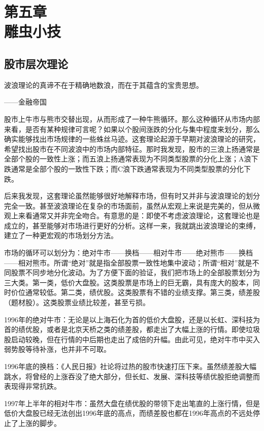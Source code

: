 \setcounter{figure}{0}
\renewcommand{\thefigure}{5-\arabic{figure}}

\section[第五章\q 雕虫小技]{第五章\\ 雕虫小技}

\subsection{股市层次理论}

{\kaishu
波浪理论的真谛不在于精确地数浪，而在于其蕴含的宝贵思想。

\hfill ——金融帝国
}

股市上牛市与熊市交替出现，从而形成了一种牛熊循环。那么这种循环从市场内部来看，是否有某种规律可言呢？如果以个股间涨跌的分化与集中程度来划分，那么确实能够找出市场规律的一些蛛丝马迹。这套理论起源于早期对波浪理论的研究，希望找出股市在不同波浪中的市场内部特征。那时我发现，股市的三浪上扬通常是全部个股的一致性上涨；而五浪上扬通常表现为不同类型股票的分化上涨；A浪下跌通常是全部个股的一致性下跌；而C浪下跌通常表现为不同类型股票的分化下跌。

后来我发现，这套理论虽然能够很好地解释市场，但有时又并非与波浪理论的划分完全一致。甚至波浪理论在复杂的市场面前，虽然从宏观上来说是完美的，但从微观上来看通常又并非完全吻合。有意思的是：即使不考虑波浪理论，这套理论也是成立的，甚至能够对市场进行更好的分析。这样一来，我就跳出波浪理论的束缚，建立了一种更宏观的市场划分方法。

市场的循环可以划分为：绝对牛市——换档——相对牛市——绝对熊市——换档——相对熊市。所谓“绝对”就是指全部股票一致性地集中波动；所谓“相对”就是不同股票不同步地分化波动。为了方便下面的验证，我们把市场上的全部股票划分为三大类。第一类，低价大盘股。这类股票是市场上的巨无霸，具有庞大的股本，同时价位通常较低。第二类，绩优股。这类股票有不错的业绩支撑。第三类，绩差股（题材股）。这类股票业绩比较差，甚至亏损。

1996年的绝对牛市：无论是以上海石化为首的低价大盘股，还是以长虹、深科技为首的绩优股，或者是北京天桥之类的绩差股，都走出了大幅上涨的行情。即使垃圾股启动较晚，但在行情的中后期也走出了成倍的升幅。由此可见，绝对牛市中买入弱势股等待补涨，也并非不可取。

1996年底的换档：《人民日报》社论将过热的股市快速打压下来。虽然绩差股大幅跳水，将曾经的上涨吞没了绝大部分，但长虹、发展、深科技等绩优股拒绝调整而表现得非常抗跌。

1997年上半年的相对牛市：虽然大盘在绩优股的带领下走出笔直的上涨行情，但是低价大盘股已经无法创出1996年底的高点，而绩差股也都在1996年高点的不远处停止了上涨的脚步。

